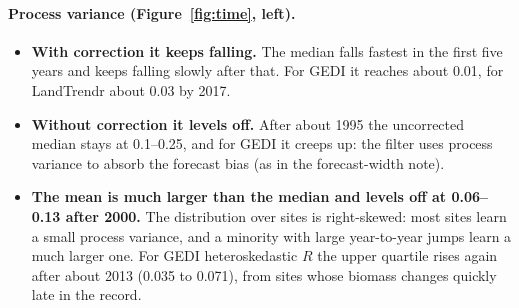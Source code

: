 \documentclass[11pt]{article}
\begin{document}
\paragraph{Process variance (Figure~\ref{fig:time}, left).}
\begin{itemize}
  \item \textbf{With correction it keeps falling.} The median falls fastest in the first five
  years and keeps falling slowly after that. For GEDI it reaches about 0.01, for LandTrendr about 0.03 by 2017.
  \item \textbf{Without correction it levels off.} After about 1995 the uncorrected median stays at 0.1--0.25, and for GEDI it creeps up:
  the filter uses process variance to absorb the forecast bias (as in the forecast-width note).
  \item \textbf{The mean is much larger than the median and levels off at 0.06--0.13 after 2000.} The distribution
  over sites is right-skewed: most sites learn a small process variance, and a minority with
  large year-to-year jumps learn a much larger one. For GEDI heteroskedastic $R$ the upper
  quartile rises again after about 2013 (0.035 to 0.071), from sites whose biomass changes
  quickly late in the record.
\end{itemize}
\end{document}
